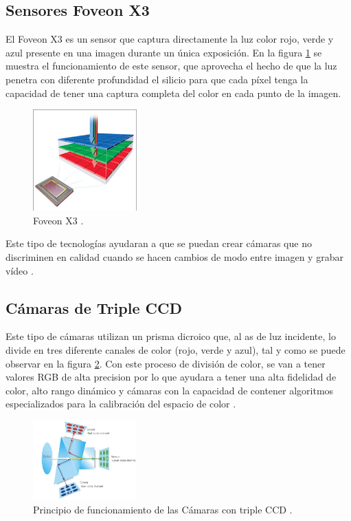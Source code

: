 \documentclass[conference]{IEEEtran}
\begin{document}
\subsection{\textbf{Sensores Foveon X3}}
El Foveon X3 es un sensor que captura directamente la luz color rojo, verde y azul presente en una imagen durante un única exposición. En la figura \ref{x3} se muestra el funcionamiento de este sensor, que aprovecha el hecho de que la luz penetra con diferente profundidad el silicio para que cada píxel tenga la capacidad de tener una captura completa del color en cada punto de la imagen.  

\begin{figure}[H]
\centering
\includegraphics[width=4cm]{x3}
\caption{Foveon X3 \cite{foveon}.}
\label{x3}
\end{figure}

Este tipo de tecnologías ayudaran a que se puedan crear cámaras que no discriminen en calidad cuando se hacen cambios de modo entre imagen y grabar vídeo \cite{foveon}.

\subsection{\textbf{C\'amaras de Triple CCD}}
Este tipo de cámaras utilizan un prisma dicroico que, al as de luz incidente, lo divide en tres diferente canales de color (rojo, verde y azul), tal y como se puede observar en la figura \ref{3ccd}. Con este proceso de división de color, se van a tener valores RGB de alta precision por lo que ayudara a tener una alta fidelidad de color, alto rango dinámico y cámaras con la capacidad de contener algoritmos especializados para la calibración del espacio de color \cite{3ccd}.

\begin{figure}[H]
\centering
\includegraphics[width=4cm]{3ccd}
\caption{Principio de funcionamiento de las Cámaras con triple CCD \cite{3ccd}.}
\label{3ccd}
\end{figure}
\end{document}
